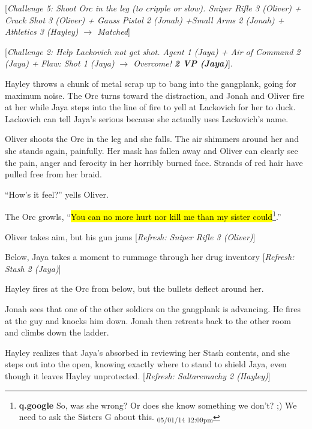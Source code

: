 {[}\textit{Challenge 5: Shoot Orc in the leg (to cripple or slow).  Sniper Rifle 3 (Oliver) + Crack Shot 3 (Oliver) + Gauss Pistol 2 (Jonah) +Small Arms 2 (Jonah) + Athletics 3 (Hayley)  $\rightarrow$ Matched}{]}



{[}\textit{Challenge 2: Help Lackovich not get shot.  Agent 1  (Jaya) + Air of Command 2  (Jaya) + }\textit{ {\color[RGB]{255,0,0}Flaw: Shot 1 (Jaya)} }\textit{  $\rightarrow$ Overcome! }\textit{\textbf{2 VP (Jaya)}}{]}.



Hayley throws a chunk of metal scrap up to bang into the gangplank, going for maximum noise.  The Orc turns toward the distraction, and Jonah and Oliver fire at her while Jaya steps into the line of fire to yell at Lackovich for her to duck.  Lackovich can tell Jaya's serious because she actually uses Lackovich's name. 



Oliver shoots the Orc in the leg and she falls.  The air shimmers around her and she stands again, painfully.  Her mask has fallen away and Oliver can clearly see the pain, anger and ferocity in her horribly burned face.  Strands of red hair have pulled free from her braid.



``How's it feel?'' yells Oliver.



The Orc growls, ``\hl{You can no more hurt nor kill me than my sister could}\footnote{\textbf{q.google }So, was she wrong?  Or does she know something we don't? ;)
We need to ask the Sisters G about this. \textsubscript{05/01/14 12:09pm}}.''



Oliver takes aim, but his gun jams {[}\textit{Refresh: Sniper Rifle 3 (Oliver)}{]}



Below, Jaya takes a moment to rummage through her drug inventory {[}\textit{Refresh: Stash 2 (Jaya)}{]}



Hayley fires at the Orc from below, but the bullets deflect around her.



Jonah sees that one of the other soldiers on the gangplank is advancing.  He fires at the guy and knocks him down.  Jonah then retreats back to the other room and climbs down the ladder.



Hayley realizes that Jaya's absorbed in reviewing her Stash contents, and she steps out into the open, knowing exactly where to stand to shield Jaya, even though it leaves Hayley unprotected.  {[}\textit{Refresh: Saltaremachy 2 (Hayley)}{]}



